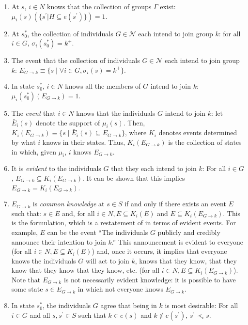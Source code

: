 \documentclass[
11pt,
titlepage,
reqno,
]{article}%
\theoremstyle{definition}
\begin{document}
	\begin{enumerate}
		\item  At $s$, $i\in N$ knows that the collection of groups $\Gamma$ exist:  $\mu_i( s)(\{s^\prime| H\subseteq e(s^\prime)\})=1$.
		
		\item At $s_0^\ast$, the collection of individuals $G\in \mathcal{N}$ each intend to join group $k$: for all $i\in G$, $\sigma_i(s_0^\ast)=k^+$.
		
		\item The event that the collection of individuals $G\in \mathcal{N}$ each intend to join group $k$: $E_{G\rightarrow k}\equiv\{ s\mid\forall i\in G, \sigma_i( s)=k^+\}$.
		
		\item In state $s_0^\ast$,  $i\in N$ knows all the members of $G$ intend to join $k$: $\mu_i(s_0^\ast)(E_{G\rightarrow k})=1$.
		
		\item The \textit{event} that $i\in N$ knows that the individuals $G$ intend to join $k$: let $\bar{E}_i( s)$ denote the support of $\mu_i( s)$. Then, $K_i (E_{G\rightarrow k})\equiv\{ s\mid\bar{E}_i( s)\subseteq E_{G\rightarrow k}\}$, where $K_i$ denotes events determined by what $i$ knows in their states. Thus, $K_i (E_{G\rightarrow k})$ is the collection of states in which, given $\mu_i$, $i$ knows $E_{G\rightarrow k}$.
		
		\item It is \textit{evident} to the individuals $G$ that they each intend to join $k$:   For all $i\in G$, $E_{G\rightarrow k}\subseteq K_i (E_{G\rightarrow k})$. It can be shown that this implies $E_{G\rightarrow k} = K_i (E_{G\rightarrow k})$.
		
		\item $E_{G\rightarrow k}$ is \textit{common knowledge} at $ s\in S$ if and only if there exists an event $E$ such that: $ s\in E$ and, for all $i\in N, E\subseteq K_i(E)$ and $E\subseteq K_i(E_{G\rightarrow k})$. This is the \cite{Monderer1989a} formulation, which is a restatement of \cite{Aumann1976} in terms of evident events. For example, $E$ can be the event ``The individuals $G$ publicly and credibly announce their intention to join $k$.'' This announcement is evident to everyone (for all $i\in N, E\subseteq K_i(E)$) and, once it occurs, it implies that everyone knows the individuals $G$ will act to join $k$, knows that they know, that they know that they know that they know, etc. (for all $i\in N, E\subseteq K_i(E_{G\rightarrow k})$). Note that $E_{G\rightarrow k}$ is not necessarily evident knowledge: it is possible to have some state $s\in E_{G\rightarrow k}$ in which not everyone knows $E_{G\rightarrow k}$.
		
		\item In state $s_0^\ast$, the individuals $G$ agree that being in $k$ is most desirable: For all $i\in G$ and all $ s, s^\prime\in S$ such that $k\in e(s)$ and $k\notin e(s^\prime)$, $ s^\prime\prec_i s$.
	\end{enumerate}
	
\end{document}

